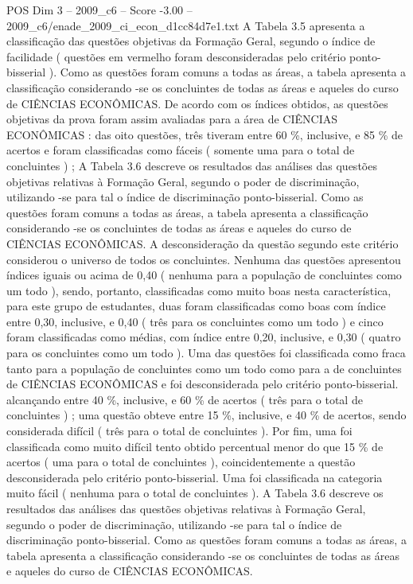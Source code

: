 \begin{textsample}{POS Dim 3 – 2009\_c6 – Score -3.00 – 2009\_c6/enade\_2009\_ci\_econ\_d1cc84d7e1.txt}
A Tabela 3.5 apresenta a classificação das questões objetivas da Formação Geral, segundo o índice de facilidade ( questões em vermelho foram desconsideradas pelo critério ponto-bisserial ).
Como as questões foram comuns a todas as áreas, a tabela apresenta a classificação considerando -se os concluintes de todas as áreas e aqueles do curso de CIÊNCIAS ECONÔMICAS.
De acordo com os índices obtidos, as questões objetivas da prova foram assim avaliadas para a área de CIÊNCIAS ECONÔMICAS : das oito questões, três tiveram entre 60 \%, inclusive, e 85 \% de acertos e foram classificadas como fáceis ( somente uma para o total de concluintes ) ; A Tabela 3.6 descreve os resultados das análises das questões objetivas relativas à Formação Geral, segundo o poder de discriminação, utilizando -se para tal o índice de discriminação ponto-bisserial.
Como as questões foram comuns a todas as áreas, a tabela apresenta a classificação considerando -se os concluintes de todas as áreas e aqueles do curso de CIÊNCIAS ECONÔMICAS.
A desconsideração da questão segundo este critério considerou o universo de todos os concluintes.
Nenhuma das questões apresentou índices iguais ou acima de 0,40 ( nenhuma para a população de concluintes como um todo ), sendo, portanto, classificadas como muito boas nesta característica, para este grupo de estudantes, duas foram classificadas como boas com índice entre 0,30, inclusive, e 0,40 ( três para os concluintes como um todo ) e cinco foram classificadas como médias, com índice entre 0,20, inclusive, e 0,30 ( quatro para os concluintes como um todo ).
Uma das questões foi classificada como fraca tanto para a população de concluintes como um todo como para a de concluintes de CIÊNCIAS ECONÔMICAS e foi desconsiderada pelo critério ponto-bisserial. alcançando entre 40 \%, inclusive, e 60 \% de acertos ( três para o total de concluintes ) ; uma questão obteve entre 15 \%, inclusive, e 40 \% de acertos, sendo considerada difícil ( três para o total de concluintes ).
Por fim, uma foi classificada como muito difícil tento obtido percentual menor do que 15 \% de acertos ( uma para o total de concluintes ), coincidentemente a questão desconsiderada pelo critério ponto-bisserial.
Uma foi classificada na categoria muito fácil ( nenhuma para o total de concluintes ).
A Tabela 3.6 descreve os resultados das análises das questões objetivas relativas à Formação Geral, segundo o poder de discriminação, utilizando -se para tal o índice de discriminação ponto-bisserial.
Como as questões foram comuns a todas as áreas, a tabela apresenta a classificação considerando -se os concluintes de todas as áreas e aqueles do curso de CIÊNCIAS ECONÔMICAS.

\end{textsample}
